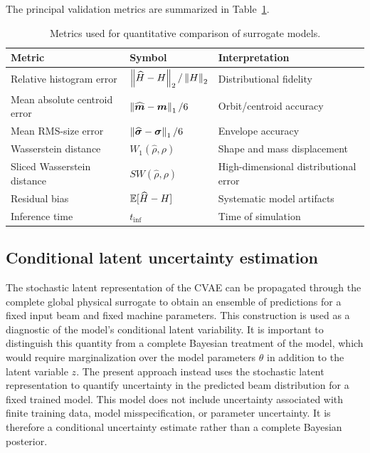 The principal validation metrics are summarized in Table~\ref{tab:metrics_definitions}.

\begin{table}[H]
\centering
\caption{Metrics used for quantitative comparison of surrogate models.}
\label{tab:metrics_definitions}
\begin{tabular}{lll}
\toprule
Metric & Symbol & Interpretation \\
\midrule
Relative histogram error & $\left\lVert\widehat{H}-H\right\rVert_2/\left\lVert H\right\rVert_2$ & Distributional fidelity \\
Mean absolute centroid error & $\left\lVert\widehat{\bm m}-\bm m\right\rVert_1/6$ & Orbit/centroid accuracy \\
Mean RMS-size error & $\left\lVert\widehat{\bm\sigma}-\bm\sigma\right\rVert_1/6$ & Envelope accuracy \\
Wasserstein distance & $W_1(\widehat{\rho},\rho)$ & Shape and mass displacement \\
Sliced Wasserstein distance & $SW(\widehat{\rho},\rho)$ & High-dimensional distributional error \\
Residual bias & $\mathbb{E}[\widehat{H}-H]$ & Systematic model artifacts \\
Inference time & $t_{\mathrm{inf}}$ & Time of simulation \\
\bottomrule
\end{tabular}
\end{table}


\subsection{Conditional latent uncertainty estimation}
\label{subsec:conditional_latent_uncertainty_method}


The stochastic latent representation of the CVAE can be propagated through the complete global physical surrogate to obtain an ensemble of predictions for a fixed input beam and fixed machine parameters. This construction is used as a diagnostic of the model's conditional latent variability. It is important to distinguish this quantity from a complete Bayesian treatment of the model, which would require marginalization over the model parameters $\theta$ in addition to the latent variable $z$. The present approach instead uses the stochastic latent representation to quantify uncertainty in the predicted beam distribution for a fixed trained model. This model does not include uncertainty associated with finite training data, model misspecification, or parameter uncertainty. It is therefore a conditional uncertainty estimate rather than a complete Bayesian posterior.

